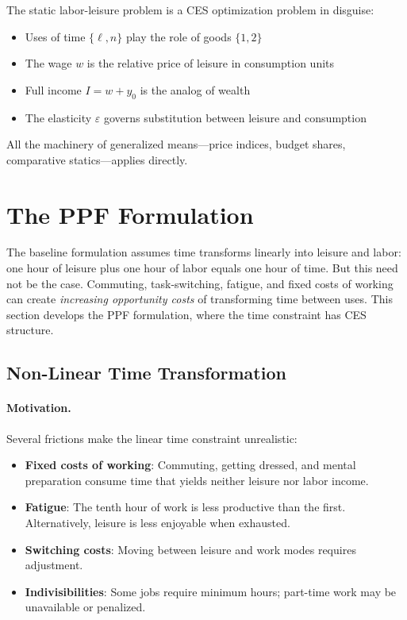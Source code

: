 \begin{callouttip}
The static labor-leisure problem is a CES optimization problem in disguise:
\begin{itemize}[nosep]
\item Uses of time $\{\ell, n\}$ play the role of goods $\{1, 2\}$
\item The wage $w$ is the relative price of leisure in consumption units
\item Full income $I = w + y_0$ is the analog of wealth
\item The elasticity $\varepsilon$ governs substitution between leisure and consumption
\end{itemize}
All the machinery of generalized means---price indices, budget shares, comparative statics---applies directly.
\end{callouttip}


\section{The PPF Formulation}
\label{sec:labor-ppf}

The baseline formulation assumes time transforms linearly into leisure and labor: one hour of leisure plus one hour of labor equals one hour of time. But this need not be the case. Commuting, task-switching, fatigue, and fixed costs of working can create \emph{increasing opportunity costs} of transforming time between uses. This section develops the PPF formulation, where the time constraint has CES structure.

\subsection{Non-Linear Time Transformation}
\label{subsec:nonlinear-time}

\paragraph{Motivation.}
Several frictions make the linear time constraint unrealistic:

\begin{itemize}[leftmargin=2em]
\item \textbf{Fixed costs of working}: Commuting, getting dressed, and mental preparation consume time that yields neither leisure nor labor income.
\item \textbf{Fatigue}: The tenth hour of work is less productive than the first. Alternatively, leisure is less enjoyable when exhausted.
\item \textbf{Switching costs}: Moving between leisure and work modes requires adjustment.
\item \textbf{Indivisibilities}: Some jobs require minimum hours; part-time work may be unavailable or penalized.
\end{itemize}

